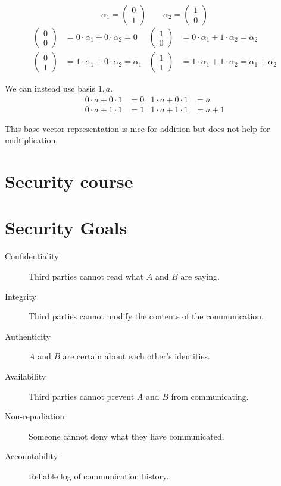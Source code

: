 \documentclass{article}
\begin{document}
    \[ \alpha_1 = \begin{pmatrix} 0 \\ 1 \end{pmatrix} \qquad
       \alpha_2 = \begin{pmatrix} 1 \\ 0 \end{pmatrix} \]
\begin{align*}
    \begin{pmatrix} 0 \\ 0 \end{pmatrix} &= 0 \cdot \alpha_1 + 0 \cdot \alpha_2 = 0 &
    \begin{pmatrix} 1 \\ 0 \end{pmatrix} &= 0 \cdot \alpha_1 + 1 \cdot \alpha_2 = \alpha_2 \\
    \begin{pmatrix} 0 \\ 1 \end{pmatrix} &= 1 \cdot \alpha_1 + 0 \cdot \alpha_2 = \alpha_1 &
    \begin{pmatrix} 1 \\ 1 \end{pmatrix} &= 1 \cdot \alpha_1 + 1 \cdot \alpha_2 = \alpha_1 + \alpha_2
\end{align*}

We can instead use basis $1, a$.
\begin{align*}
    0 \cdot a + 0 \cdot 1 &= 0 &
    1 \cdot a + 0 \cdot 1 &= a \\
    0 \cdot a + 1 \cdot 1 &= 1 &
    1 \cdot a + 1 \cdot 1 &= a + 1
\end{align*}

This base vector representation is nice for addition but does not help for
multiplication.

\section {Security course}
\section{Security Goals}

\begin{description}
  \item[Confidentiality] Third parties cannot read what $A$ and $B$ are saying.
  \item[Integrity] Third parties cannot modify the contents of the communication.
  \item[Authenticity] $A$ and $B$ are certain about each other's identities.
  \item[Availability] Third parties cannot prevent $A$ and $B$ from communicating.
  \item[Non-repudiation] Someone cannot deny what they have communicated.
  \item[Accountability] Reliable log of communication history.
\end{description}
\end{document}
